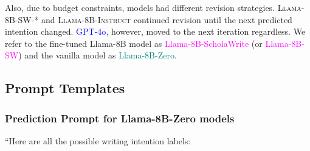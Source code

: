 Also, due to budget constraints, models had different revision strategies. \textsc{Llama-8B-SW-*} and \textsc{Llama-8B-Instruct} continued revision until the next predicted intention changed. \textcolor{blue}{GPT-4o}, however, moved to the next iteration regardless. We refer to the fine-tuned Llama-8B model as \textcolor{magenta}{Llama-8B-ScholaWrite} (or \textcolor{magenta}{Llama-8B-SW}) and the vanilla model as \textcolor{teal}{Llama-8B-Zero}.


\subsection{Prompt Templates} \label{sec:appendix:prompt}

\subsubsection{Prediction Prompt for Llama-8B-Zero models}

``Here are all the possible writing intention labels:

